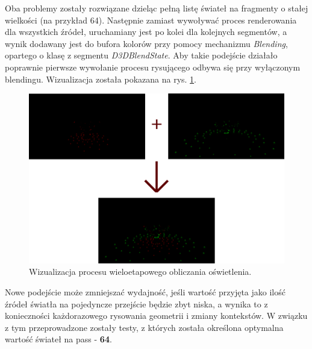	Oba problemy zostały rozwiązane dzieląc pełną listę świateł na fragmenty o stałej wielkości (na przykład 64). Następnie zamiast wywoływać proces renderowania dla wszystkich źródeł, uruchamiany jest po kolei dla kolejnych segmentów, a wynik dodawany jest do bufora kolorów przy pomocy mechanizmu \textit{Blending}, opartego o klasę z segmentu \textit{D3DBlendState}. Aby takie podejście działało poprawnie pierwsze wywołanie procesu rysującego odbywa się przy wyłączonym blendingu. Wizualizacja została pokazana na rys. \ref{Rendering_MultiPassLighting}.
	
	\begin{figure}[h!]
		\centering
		\includegraphics[width=\textwidth]{images/lightsTest_combined.png}
		\caption{Wizualizacja procesu wieloetapowego obliczania oświetlenia.}
		\label{Rendering_MultiPassLighting}
	\end{figure}
	
	Nowe podejście może zmniejszać wydajność, jeśli wartość przyjęta jako ilość źródeł światła na pojedyncze przejście będzie zbyt niska, a wynika to z konieczności każdorazowego rysowania geometrii i zmiany kontekstów. W związku z tym przeprowadzone zostały testy, z których została określona optymalna wartość świateł na pass - \textbf{64}.
